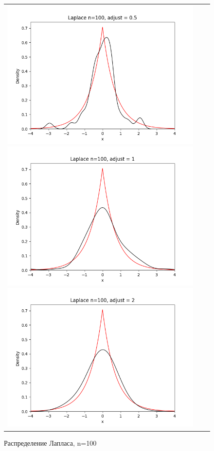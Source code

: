 \begin{figure}[H]
	\begin{tabular}{ccc}
		\includegraphics[scale=0.33]{laplace_n100_adjust0.5.png}
		\includegraphics[scale=0.33]{laplace_n100_adjust1.png}
		\includegraphics[scale=0.33]{laplace_n100_adjust2.png}
	\end{tabular}
	\caption{Распределение Лапласа, n=100}
\end{figure}

